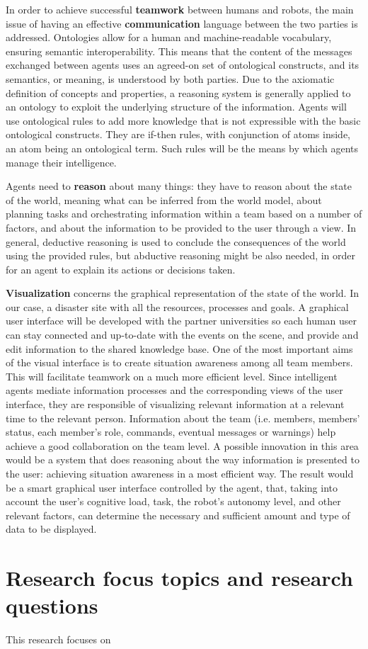 In order to achieve successful \textbf{teamwork} between humans and robots, the main issue of having an effective \textbf{communication} language between the two parties is addressed. Ontologies allow for a human and machine-readable vocabulary, ensuring semantic interoperability. This means that the content of the messages exchanged between agents uses an agreed-on set of ontological constructs, and its semantics, or meaning, is understood by both parties. Due to the axiomatic definition of concepts and properties, a reasoning system is generally applied to an ontology to exploit the underlying structure of the information. Agents will use ontological rules to add more knowledge that is not expressible with the basic ontological constructs. They are if-then rules, with conjunction of atoms inside, an atom being an ontological term.
Such rules will be the means by which agents manage their intelligence. 

Agents need to \textbf{reason} about many things: they have to reason about the state of the world, meaning what can be inferred from the world model, about planning tasks and orchestrating information within a team based on a number of factors, and about the information to be provided to the user through a view. In general, deductive reasoning is used to conclude the consequences of the world using the provided rules, but abductive reasoning might be also needed, in order for an agent to explain its actions or decisions taken.

\textbf{Visualization} concerns the graphical representation of the state of the world. In our case, a disaster site with all the resources, processes and goals. A graphical user interface will be developed with the partner universities so each human user can stay connected and up-to-date with the events on the scene, and provide and edit information to the shared knowledge base. One of the most important aims of the visual interface is to create situation awareness among all team members. This will facilitate teamwork on a much more efficient level.
Since intelligent agents mediate information processes and the corresponding views of the user interface, they are responsible of visualizing relevant information at a relevant time to the relevant person. Information about the team (i.e. members, members' status, each member's role, commands, eventual messages or warnings) help achieve a good collaboration on
the team level. A possible innovation in this area would be a system that does reasoning about the way information is presented to the user: achieving situation awareness in a most efficient way. The result would be a smart graphical user interface controlled by the agent, that, taking into account the user's cognitive load, task, the robot's autonomy level, and other relevant factors, can determine the necessary and sufficient amount and type of data to be displayed.


\section{Research focus topics and research questions}
    
This research focuses on     
    
  
  
  
  
  
  
  